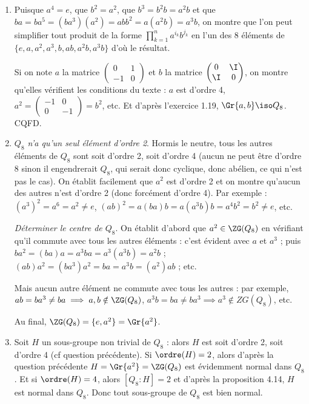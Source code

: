 
\begin{enumerate}
  \item Puisque $a^4=e$, que $b^2 = a^2$, que $b^3 = b^2b=a^2b$ et que $ba = ba^5 = (ba^3)(a^2)=abb^2=a(a^2b)=a^3b$, on montre que l'on peut simplifier 
  tout produit de la forme $\prod\limits_{k=1}^n a^{i_k}b^{j_k}$ en l'un des 8 éléments de $\{e,a,a^2,a^3, b, ab, a^2b, a^3b\}$ d'où le résultat.

  Si on note $a$ la matrice $\begin{pmatrix}0&1\\-1&0\end{pmatrix}$ et $b$ la matrice $\begin{pmatrix}0&\I \\ \I&0\end{pmatrix}$,
  on montre qu'elles vérifient les conditions du texte : $a$ est d'ordre 4, $a^2 = \begin{pmatrix}-1&0\\0&-1\end{pmatrix} = b^2$, etc. Et d'après
  l'exercice 1.19, $\Gr{a,b} \iso Q_8$. CQFD.

  \item \emph{$Q_8$ n'a qu'un seul élément d'ordre 2}. Hormis le neutre, tous les autres éléments de $Q_8$ sont soit d'ordre 2, soit d'ordre 4 (aucun ne peut être d'ordre 8 sinon il engendrerait $Q_8$, qui serait donc cyclique, donc abélien, ce qui n'est pas le cas).
  On établit facilement que $a^2$ est d'ordre 2 et on montre qu'aucun des autres n'est d'ordre 2 (donc forcément d'ordre 4). Par exemple : $(a^3)^2 = a^6=a^2\neq e$, $(ab)^2 = a(ba)b=a(a^3b)b=a^4b^2 = b^2\neq e$, etc.

  \emph{Déterminer le centre de $Q_8$}. On établit d'abord que $a^2 \in \ZG(Q_8)$ en vérifiant qu'il commute avec tous les autres éléments : c'est évident avec $a$ et $a^3$ ; puis
  $ba^2 = (ba)a = a^3b a = a^3(a^3b) = a^2b$ ; $(ab)a^2 = (ba^3)a^2 = ba = a^3b = (a^2)ab$ ; etc.

  Mais aucun autre élément ne commute avec tous les autres : par exemple, $ab = ba^3\neq ba\implies a,b \notin \ZG(Q_8)$, $a^3b = ba \neq ba^3\implies a^3\notin ZG(Q_8)$, etc.

  Au final, $\ZG(Q_8) = \{e, a^2\}= \Gr{a^2}$.
   \item Soit $H$ un sous-groupe non trivial de $Q_8$ : alors $H$ est soit d'ordre 2, soit d'ordre 4 (cf question précédente). Si $\ordre(H)=2$,%
   alors d'après la question précédente $H=\Gr{a^2} = \ZG(Q_8)$ est évidemment normal dans $Q_8$. Et si $\ordre(H)=4$, alors $[Q_8:H] = 2$ et
   d'après la proposition 4.14, $H$ est normal dans $Q_8$. Donc tout sous-groupe de $Q_8$ est bien normal.
  
\end{enumerate}
